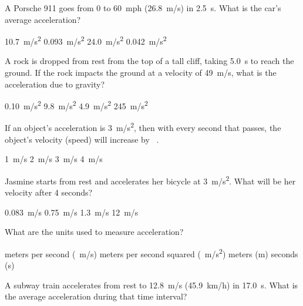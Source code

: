 \documentclass[addpoints]{exam}
\begin{document}
\begin{questions}

\question 
A Porsche 911 goes from 0 to \SI{60}{mph} (\SI{26.8}{m/s}) in \SI{2.5}{s}. What is the car's average acceleration? 

\begin{choices}
    \correctchoice \SI{10.7}{m/s^2}
    \choice \SI{0.093}{m/s^2}
    \choice \SI{24.0}{m/s^2}
    \choice \SI{0.042}{m/s^2}
\end{choices}

\question
A rock is dropped from rest from the top of a tall cliff, taking \SI{5.0}{s} to reach the ground. If the rock impacts the ground at a velocity of \SI{49}{m/s}, what is the acceleration due to gravity?

\begin{choices}
    \choice \SI{0.10}{m/s^2}
    \correctchoice \SI{9.8}{m/s^2}
    \choice \SI{4.9}{m/s^2}
    \choice \SI{245}{m/s^2}
\end{choices}

\question
If an object's acceleration is \SI{3}{m/s^2}, then with every second that passes, the object's velocity (speed) will increase by \fillin[][2cm]\ .

\begin{choices}
    \choice \SI{1}{m/s}
    \choice \SI{2}{m/s}
    \correctchoice \SI{3}{m/s}
    \choice \SI{4}{m/s}
\end{choices}

\question
Jasmine starts from rest and accelerates her bicycle at \SI{3}{m/s^2}. What will be her velocity after 4 seconds?

\begin{choices}
    \choice \SI{0.083}{m/s}
    \choice \SI{0.75}{m/s}
    \choice \SI{1.3}{m/s}
    \correctchoice \SI{12}{m/s}
\end{choices}

\question
What are the units used to measure acceleration?

\begin{choices}
    \choice meters per second (\SI{}{m/s})
    \correctchoice meters per second squared (\SI{}{m/s^2})
    \choice meters (m)
    \choice seconds (s)
\end{choices}

\clearpage
\question %
A subway train accelerates from rest to \SI{12.8}{m/s} (\SI{45.9}{km/h}) in \SI{17.0}{s}. What is the average acceleration during that time interval?


\end{questions}
\end{document}
